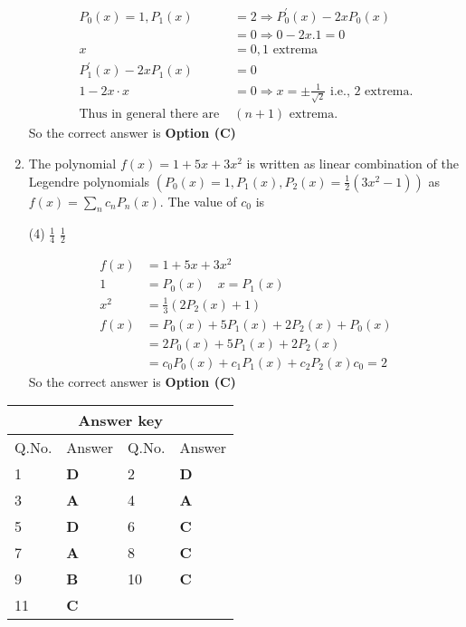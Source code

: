 \begin{enumerate}[label=\color{ocre}\textbf{\arabic*.}]
\begin{answer}
\begin{align*}
		P_{0}(x)=1, P_{1}(x)&=2 \Rightarrow P_{0}^{\prime}(x)-2 x P_{0}(x)\\&=0 \Rightarrow 0-2 x .1=0\\
		x&=0,1\text{ extrema}\\
		P_{1}^{\prime}(x)-2 x P_{1}(x)&=0\\
		1-2 x \cdot x&=0 \Rightarrow x=\pm \frac{1}{\sqrt{2}}\text{ i.e., 2 extrema.}\\
		\text{Thus in general there are }&(n+1)\text{ extrema.}
		\end{align*}
		So the correct answer is \textbf{Option (C)}
	\end{answer}
	
	\item The polynomial $f(x)=1+5 x+3 x^{2}$ is written as linear combination of the Legendre polynomials
	$\left(P_{0}(x)=1, P_{1}(x), P_{2}(x)=\frac{1}{2}\left(3 x^{2}-1\right)\right)$ as $f(x)=\sum_{n} c_{n} P_{n}(x)$. The value of $c_{0}$ is
	{}
	\begin{tasks}(4)
		\task[\textbf{A.}] $\frac{1}{4}$
		\task[\textbf{B.}] $\frac{1}{2}$
	\end{tasks}
	\begin{answer}
		\begin{align*}
		f(x)&=1+5 x+3 x^{2}\\
		1&=P_{0}(x) \quad x=P_{1}(x)\\
		x^{2}&=\frac{1}{3}\left(2 P_{2}(x)+1\right)\\
		f(x)&=P_{0}(x)+5 P_{1}(x)+2 P_{2}(x)+P_{0}(x)\\
		&=2 P_{0}(x)+5 P_{1}(x)+2 P_{2}(x)\\
		&=c_{0} P_{0}(x)+c_{1} P_{1}(x)+c_{2} P_{2}(x) c_{0}=2
		\end{align*}
		So the correct answer is \textbf{Option (C)}
	\end{answer}
	
	
\end{enumerate}
\setlength\arrayrulewidth{1pt}
\begin{table}[H]
	\centering
	\begin{tabular}{|p{1.5cm}|p{1.5cm}||p{1.5cm}|p{1.5cm}|}
		\hline
		\multicolumn{4}{|c|}{\textbf{Answer key}}\\\hline\hline
		\rowcolor{ocrel}Q.No.&Answer&Q.No.&Answer\\\hline
		1&\textbf{D} &2&\textbf{D}\\\hline 
		3&\textbf{A} &4&\textbf{A} \\\hline
		5&\textbf{D} &6&\textbf{C} \\\hline
		7&\textbf{A}&8&\textbf{C}\\\hline
		9&\textbf{B}&10&\textbf{C}\\\hline
		11&\textbf{C} &&\\\hline
		
		
	\end{tabular}
\end{table}

